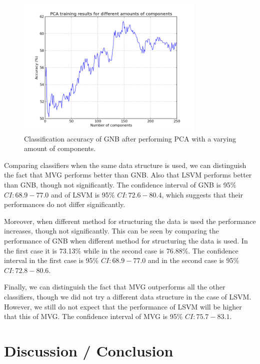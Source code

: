 \documentclass[preprint,journal,11pt]{vgtc}
\begin{document}
\begin{figure}
	\centering
	\includegraphics[width=90mm]{figures/pca_plot_by_index.png}
  	\caption{Classification accuracy of GNB after performing PCA with a varying amount of components.}
  	\label{fig:pca_components}
\end{figure}

Comparing classifiers when the same data structure is used, we can distinguish the fact that MVG performs better than GNB. Also that LSVM performs better than GNB, though not significantly. The confidence interval of GNB is 95\% $CI: 68.9-77.0$ and of LSVM is 95\% $CI: 72.6-80.4$, which suggests that their performances do not differ significantly.

Moreover, when different method for structuring the data is used the performance increases, though not significantly. This can be seen by comparing the performance of GNB when different method for structuring the data is used. In the first case it is 73.13\% while in the second case is 76.88\%. The confidence interval in the first case is 95\% $CI: 68.9 - 77.0$ and in the second case is 95\% $CI: 72.8 - 80.6$.

Finally, we can distinguish the fact that MVG outperforms all the other classifiers, though we did not try a different data structure in the case of LSVM. However, we still do not expect that the performance of LSVM will be higher that this of MVG. The confidence interval of MVG is 95\% $CI: 75.7-83.1$.

\section{Discussion / Conclusion}
\label{sec:discussion}
\end{document}
